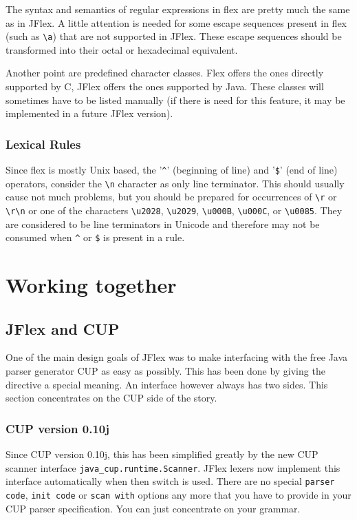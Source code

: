 \documentclass[11pt]{scrartcl}
\begin{document}
The syntax and semantics of regular expressions in flex are pretty much the
same as in JFlex. A little attention is needed for some escape sequences 
present in flex (such as \verb+\a+) that are not supported in JFlex. These
escape sequences should be transformed into their octal or hexadecimal 
equivalent. 

Another point are predefined character classes. Flex offers the ones directly
supported by C, JFlex offers the ones supported by Java. These classes will
sometimes have to be listed manually (if there is need for this feature, it
may be implemented in a future JFlex version).

\subsubsection{Lexical Rules}
Since flex is mostly Unix based, the '\verb+^+' (beginning of line) and
'\verb+$+' (end of line) operators, consider the \verb+\n+ character as %
only line terminator. This should usually cause not much problems, but you
should be prepared for occurrences of \verb+\r+ or \verb+\r\n+ or one of
the characters \verb+\u2028+, \verb+\u2029+, \verb+\u000B+, \verb+\u000C+, 
or \verb+\u0085+. They are considered to be line terminators in Unicode and 
therefore may not be consumed when 
\verb+^+ or \verb+$+ is present in a rule.%

\section{Working together\label{WorkingTog}}

\subsection{JFlex and CUP\label{CUPWork}}
One of the main design goals of JFlex was to make interfacing with the free
Java parser generator CUP \cite{CUP} as easy as possibly. 
This has been done by giving
the \texttt{} directive a special meaning. An
interface however always has two sides. This section concentrates on the
CUP side of the story.

\subsubsection{CUP version 0.10j}
Since CUP version 0.10j, this has been simplified greatly by the new 
CUP scanner interface \texttt{java\_cup.runtime.Scanner}. JFlex lexers now implement
this interface automatically when then \texttt{}
switch is used. There are no special \texttt{parser code}, \texttt{init
  code} or \texttt{scan with} options any more that you have to provide
in your CUP parser specification. You can just concentrate on your grammar.
\end{document}
